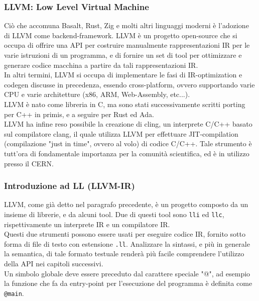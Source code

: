 \subsubsection{LLVM: Low Level Virtual Machine}
Ciò che accomuna Basalt, Rust, Zig e molti altri linguaggi moderni è l'adozione di LLVM 
come backend-framework. LLVM è un progetto open-source che si occupa di offrire una API 
per costruire manualmente rappresentazioni IR per le varie istruzioni di un programma, 
e di fornire un set di tool per ottimizzare e generare codice macchina a partire
da tali rappresentazioni IR. \\ 

In altri termini, LLVM si occupa di implementare le fasi di IR-optimization e 
codegen discusse in precedenza, essendo cross-platform, ovvero supportando 
varie CPU e varie architetture (x86, ARM, Web-Assembly, etc...). \\

LLVM è nato come libreria in C, ma sono stati successivamente scritti porting 
per C++ in primis, e a seguire per Rust ed Ada. \\

LLVM ha infine reso possibile la creazione di cling, un interprete C/C++ basato 
sul compilatore clang, il quale utilizza LLVM per effettuare JIT-compilation 
(compilazione "just in time", ovvero al volo) di codice C/C++. Tale 
strumento è tutt'ora di fondamentale importanza per la comunità scientifica, 
ed è in utilizzo presso il CERN.

\newpage

\subsubsection{Introduzione ad LL (LLVM-IR)}
LLVM, come già detto nel paragrafo precedente, è un progetto composto da un 
insieme di librerie, e da alcuni tool. Due di questi tool sono \texttt{lli} ed 
\texttt{llc}, rispettivamente un interprete IR e un compilatore IR. \\

Questi due strumenti possono essere usati per eseguire codice IR, fornito 
sotto forma di file di testo con estensione \texttt{.ll}. Analizzare la sintassi, 
e più in generale la semantica, di tale formato testuale renderà più facile comprendere 
l'utilizzo della API nei capitoli successivi. \\

Un simbolo globale deve essere preceduto dal carattere speciale "@", ad 
esempio la funzione che fa da entry-point per l'esecuzione del programma 
è definita come \texttt{@main}. \\ 

